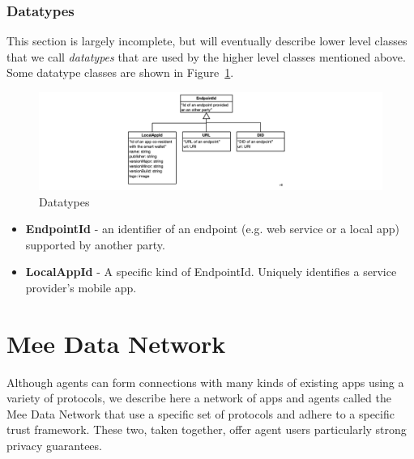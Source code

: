 \documentclass[11pt, oneside]{article}   	%
\begin{document}
\subsubsection{Datatypes}

This section is largely incomplete, but will eventually describe lower level classes that we call \emph{datatypes} that are used by the higher level classes mentioned above. Some datatype classes are shown in Figure~\ref{fig:datatypes}.

\begin{figure}[htbp]
\includegraphics[width=\textwidth]{./images/datatypes.png}
\caption{Datatypes}
\label{fig:datatypes}
\end{figure}

\begin{itemize}
\item \textbf{EndpointId} -  an identifier of an endpoint (e.g. web service or a local app) supported by another party.
\item \textbf{LocalAppId} - A specific kind of EndpointId. Uniquely identifies a service provider's mobile app. 
\
\end{itemize}

\section{Mee Data Network} %

Although agents can form connections with many kinds of existing apps using a variety of protocols, we describe here a network of apps and agents called the Mee Data Network that use a specific set of protocols and adhere to a specific trust framework. These two, taken together, offer agent users particularly strong privacy guarantees.
\end{document}
